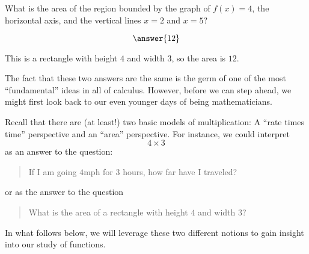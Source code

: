 \documentclass{ximera}
\begin{document}
  \begin{question}
    What is the area of the region bounded by the graph of $f(x) = 4$, the horizontal
    axis, and the vertical lines $x=2$ and $x=5$?
    \begin{prompt}
      \[
      \answer{12}
      \]
    \end{prompt}
    \begin{hint}
      \begin{image}
\end{image}
    \end{hint}
    \begin{hint}
      This is a rectangle with height $4$ and width $3$, so the area is $12$.
    \end{hint}
  \end{question}


The fact that these two answers are the same is the germ of one of the
most ``fundamental'' ideas in all of calculus. However, before we can
step ahead, we might first look back to our even younger days of being mathematicians.

Recall that there are (at least!) two basic models of multiplication:
A ``rate times time'' perspective and an ``area'' perspective.  For
instance, we could interpret
\[
4\times 3
\]
as an answer to the question:
\begin{quote}
  If I am going $4 \textrm{mph}$ for $3$ hours, how far have I
  traveled?
  \end{quote}
or as the answer to the question
\begin{quote}
  What is the area of a rectangle with height $4$ and width $3$?
\end{quote}
In what follows below, we will leverage these two different notions to
gain insight into our study of functions.
\end{document}
